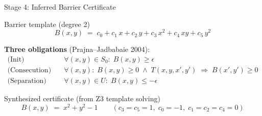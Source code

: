 \documentclass[aspectratio=169]{beamer}
\begin{document}

\begin{frame}{Stage 4: Inferred Barrier Certificate}
\begin{block}{Barrier template (degree 2)}
\vspace{-0.3em}
\[
  B(x, y) \;=\; c_0 + c_1\,x + c_2\,y + c_3\,x^2 + c_4\,xy + c_5\,y^2
\]
\end{block}

\vspace{0.3em}
\textbf{Three obligations} (Prajna--Jadbabaie 2004):
\begin{align}
  \text{(Init)}\quad & \forall (x,y) \in S_0:\; B(x,y) \ge \epsilon \label{eq:init}\\[4pt]
  \text{(Consecution)}\quad & \forall (x,y):\;
    B(x,y) \ge 0 \;\wedge\; T(x,y,x',y')
    \;\Rightarrow\; B(x',y') \ge 0 \label{eq:consec}\\[4pt]
  \text{(Separation)}\quad & \forall (x,y) \in U:\; B(x,y) \le -\epsilon \label{eq:sep}
\end{align}

\vspace{0.5em}
\begin{block}{Synthesized certificate (from Z3 template solving)}
\vspace{-0.3em}
\[
  \boxed{B(x, y) \;=\; x^2 + y^2 - 1}
  \qquad (c_3 = c_5 = 1,\; c_0 = -1,\; c_1 = c_2 = c_4 = 0)
\]
\end{block}
\end{frame}
\end{document}
